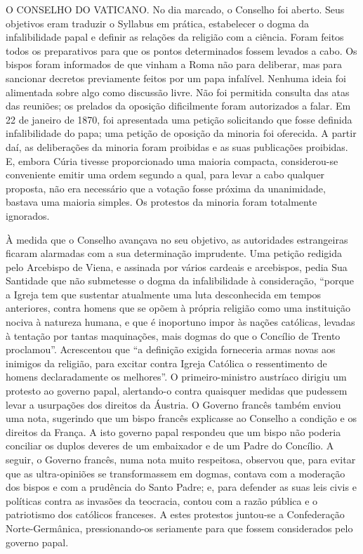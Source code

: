 \documentclass[11pt,a5paper,twoside,openany]{book}
\begin{document}
O CONSELHO DO VATICANO. No dia marcado, o Conselho foi aberto. Seus objetivos eram traduzir o Syllabus em prática, estabelecer o dogma da infalibilidade papal e definir as relações da religião com a ciência. Foram feitos todos os preparativos para que os pontos determinados fossem levados a cabo. Os bispos foram informados de que vinham a Roma não para deliberar, mas para sancionar decretos previamente feitos por um papa infalível. Nenhuma ideia foi alimentada sobre algo como discussão livre. Não foi permitida consulta das atas das reuniões; os prelados da oposição dificilmente foram autorizados a falar. Em 22 de janeiro de 1870, foi apresentada uma petição solicitando que fosse definida infalibilidade do papa; uma petição de oposição da minoria foi oferecida. A partir daí, as deliberações da minoria foram proibidas e as suas publicações proibidas. E, embora Cúria tivesse proporcionado uma maioria compacta, considerou-se conveniente emitir uma ordem segundo a qual, para levar a cabo qualquer proposta, não era necessário que a votação fosse próxima da unanimidade, bastava uma maioria simples. Os protestos da minoria foram totalmente ignorados.

À medida que o Conselho avançava no seu objetivo, as autoridades estrangeiras ficaram alarmadas com a sua determinação imprudente. Uma petição redigida pelo Arcebispo de Viena, e assinada por vários cardeais e arcebispos, pedia Sua Santidade que não submetesse o dogma da infalibilidade à consideração, “porque a Igreja tem que sustentar atualmente uma luta desconhecida em tempos anteriores, contra homens que se opõem à própria religião como uma instituição nociva à natureza humana, e que é inoportuno impor às nações católicas, levadas à tentação por tantas maquinações, mais dogmas do que o Concílio de Trento proclamou”. Acrescentou que “a definição exigida forneceria armas novas aos inimigos da religião, para excitar contra Igreja Católica o ressentimento de homens declaradamente os melhores”. O primeiro-ministro austríaco dirigiu um protesto ao governo papal, alertando-o contra quaisquer medidas que pudessem levar a usurpações dos direitos da Áustria. O Governo francês também enviou uma nota, sugerindo que um bispo francês explicasse ao Conselho a condição e os direitos da França. A isto governo papal respondeu que um bispo não poderia conciliar os duplos deveres de um embaixador e de um Padre do Concílio. A seguir, o Governo francês, numa nota muito respeitosa, observou que, para evitar que as ultra-opiniões se transformassem em dogmas, contava com a moderação dos bispos e com a prudência do Santo Padre; e, para defender as suas leis civis e políticas contra as invasões da teocracia, contou com a razão pública e o patriotismo dos católicos franceses. A estes protestos juntou-se a Confederação Norte-Germânica, pressionando-os seriamente para que fossem considerados pelo governo papal.
\end{document}
